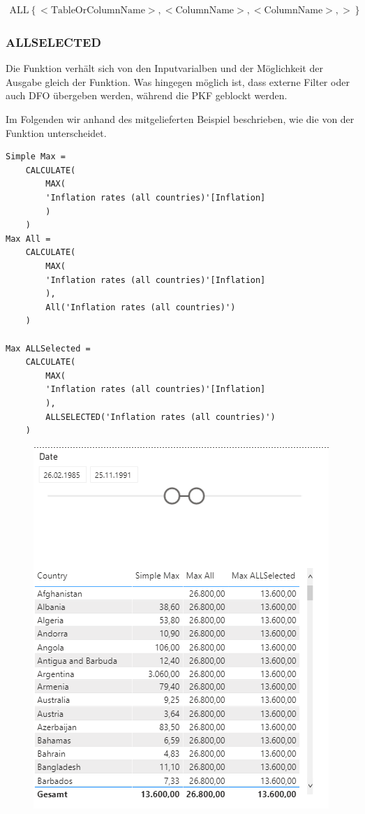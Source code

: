 \begin{align*}
	\text{ALL} \left\lbrace <\text{TableOrColumnName}>,<\text{ColumnName}>,<\text{ColumnName}>,>\right\rbrace
\end{align*}

\subsubsection{ALLSELECTED}
Die  Funktion verhält sich von den Inputvarialben und der Möglichkeit der Ausgabe gleich der  Funktion. Was hingegen möglich ist, dass externe Filter oder auch \gls{DFO} übergeben werden, während die \gls{PKF} geblockt werden.

Im Folgenden wir anhand des mitgelieferten Beispiel beschrieben, wie die  von der  Funktion unterscheidet.

\begin{lstlisting}[style=DAX]
Simple Max = 
	CALCULATE(
		MAX(
		'Inflation rates (all countries)'[Inflation]
		)
	)
Max All = 
	CALCULATE(
		MAX(
		'Inflation rates (all countries)'[Inflation]
		),
		All('Inflation rates (all countries)')
	)
	
Max ALLSelected = 
	CALCULATE(
		MAX(
		'Inflation rates (all countries)'[Inflation]
		),
		ALLSELECTED('Inflation rates (all countries)')
	)
\end{lstlisting}

\begin{figure}[H]
	\centering
	\includegraphics[scale = 0.3]{attachment/chapter_1/Scc155}
\end{figure}


